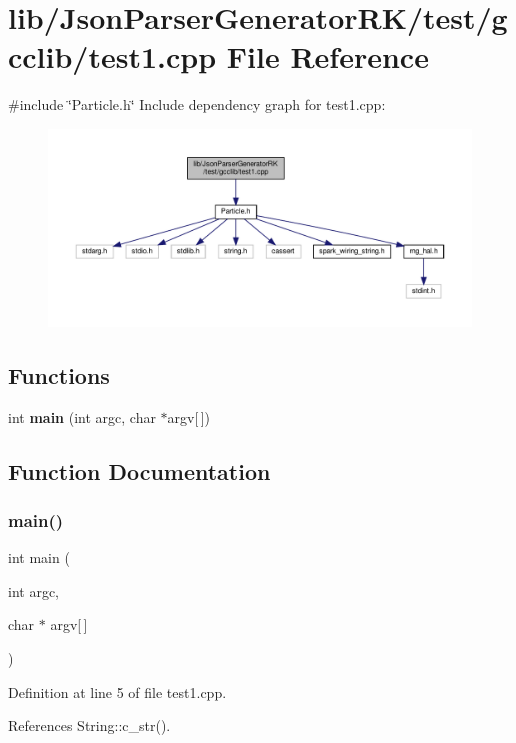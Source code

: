 \section{lib/\+Json\+Parser\+Generator\+R\+K/test/gcclib/test1.cpp File Reference}
\label{test1_8cpp}
{\ttfamily \#include \char`\"{}Particle.\+h\char`\"{}}\newline
Include dependency graph for test1.\+cpp\+:\nopagebreak
\begin{figure}[H]
\begin{center}
\leavevmode
\includegraphics[width=350pt]{test1_8cpp__incl}
\end{center}
\end{figure}
\subsection*{Functions}
\begin{DoxyCompactItemize}
\item 
int \textbf{ main} (int argc, char $\ast$argv[$\,$])
\end{DoxyCompactItemize}


\subsection{Function Documentation}
\mbox{\label{test1_8cpp_a0ddf1224851353fc92bfbff6f499fa97}} 
\subsubsection{main()}
{\footnotesize\ttfamily int main (\begin{DoxyParamCaption}\item[{int}]{argc,  }\item[{char $\ast$}]{argv[$\,$] }\end{DoxyParamCaption})}



Definition at line 5 of file test1.\+cpp.



References String\+::c\+\_\+str().


